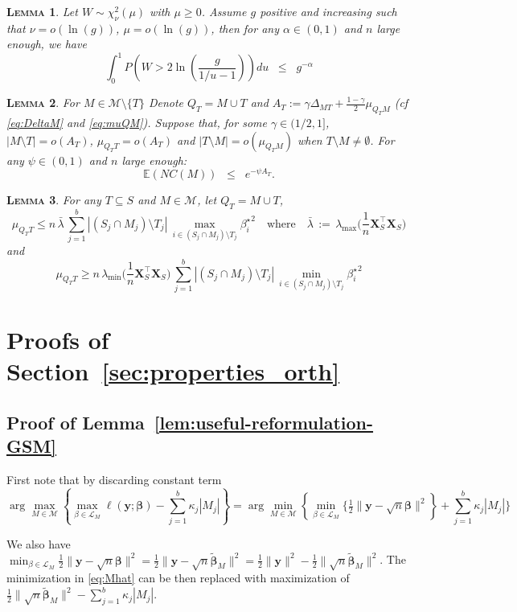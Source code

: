 \documentclass[aos]{imsart}
\theoremstyle{plain}
\newtheorem{lem}{\textsc{Lemma}}[section]
\newcommand{\E}{\mathbb{E}}
\newcommand{\M}{\mathcal{M}}
\newcommand{\bs}{\boldsymbol}
\begin{document}
\begin{lem}\label{lemma:s20}
 Let $W\sim \chi_\nu^2(\mu)$ with $\mu \geq 0$. Assume $g$ positive and increasing such that $\nu=o(\ln(g))$, $\mu=o(\ln(g))$, then for any $\alpha\in(0,1)$ and $n$ large enough, we have
$$
\int_0^1 P\left(W>2 \ln \left(\frac{g}{1 / u-1}\right)\right) d u\;\; \leq\;\;  g^{-\alpha}$$
\end{lem}

\begin{lem}\label{lem:boundexpnc} For $M\in \M\setminus \{T\}$ 
Denote $Q_T= M\cup T$ and $A_T:=\gamma\Delta_{MT}+\tfrac{1-\gamma}{2}\mu_{Q_TM}$ (cf \eqref{eq:DeltaM} and \eqref{eq:muQM}). Suppose that, for some $\gamma \in (1/2,1]$, $|M\setminus T|=o(A_T)$, $\mu_{Q_T T}=o(A_T)$ and $|T\setminus M|=o(\mu_{Q_TM})$ when $T\setminus M\neq \emptyset$. For any $\psi\in(0,1)$ and $n$ large enough:
$$\E\left(NC(M)\right)  \;\;\leq\;\; e^{-\psi A_T}.$$
\end{lem}

\begin{lem}\label{lem:upperboundnoncentralgen}
    For any $T\subseteq S$ and $M\in \M$, let $Q_T=M\cup T$, $$\mu_{Q_TT} \leq n\,\bar{\lambda}\,\sum_{j=1}^b|(S_j\cap M_j )\setminus T_j|\,\max_{i\in (S_j\cap M_j )\setminus T_j}{\beta_{i}^{\star}}^2 \quad \text{where}\quad \bar{\lambda}\,:=\,\lambda_{\max}\Big(\frac1n \bs X_{S}^\top\bs X_{S}\Big)$$
    and
    $$\mu_{Q_TT} \geq n\,\lambda_{\min}\Big(\frac1n \bs X_{S}^\top\bs X_{S}\Big)\,\sum_{j=1}^b|(S_j\cap M_j )\setminus T_j|\,\min_{i\in (S_j\cap M_j )\setminus T_j}{\beta_{i}^{\star}}^2$$
\end{lem}

\section{Proofs of Section~\ref{sec:properties_orth}}


\subsection{Proof of Lemma~\ref{lem:useful-reformulation-GSM}}
First note that by discarding constant term 
 $$\arg\max_{M\in \M} \left\{\max_{\beta\in \mathcal{L}_M}\ell(\bs y; \bs \beta)-\sum_{j=1}^b\kappa_j |M_j| \right\}=\arg\min_{M\in \M} \left\{\min_{\beta\in \mathcal{L}_M}\bigg\{ \tfrac{1}{2}\|\bs y-\sqrt{n}\bs\beta\|^2\right\}+\sum_{j=1}^b\kappa_j |M_j| \bigg\}$$
 
 We also have $\min_{\beta\in \mathcal{L}_M} \tfrac{1}{2}\|\bs y-\sqrt{n}\bs\beta\|^2=\tfrac{1}{2}\|\bs y-\sqrt{n}\tilde{\bs \beta}_M\|^2=\tfrac{1}{2}\|\bs y\|^2-\tfrac{1}{2}\|\sqrt{n}\tilde{\bs \beta}_M\|^2$. The minimization in \eqref{eq:Mhat} can be then replaced with maximization of $\tfrac{1}{2}
 \|\sqrt{n}\tilde{\bs \beta}_M\|^2-\sum_{j=1}^b \kappa_j|M_j|$.
\end{document}
